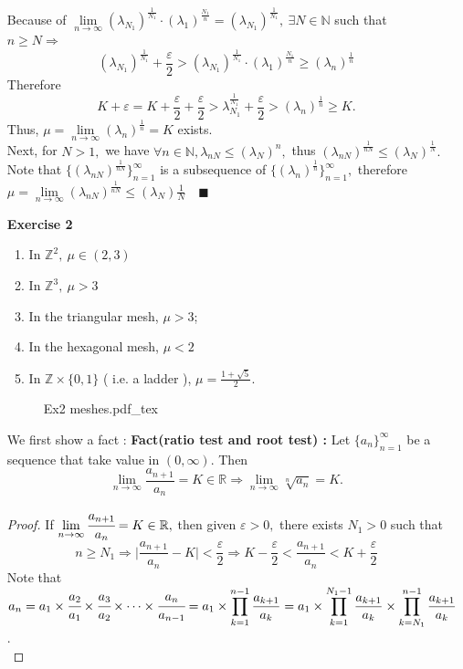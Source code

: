 \documentclass[12pt,a4paper]{article}
\newcommand{\SOL}{\fbox{ \tt s\parbox[b][2pt][c]{6pt}{o}\hspace*{-7pt} L:}}
\newcommand{\incfig}[1]{%
{#1.pdf_tex}
}
\begin{document}
\begin{enumerate}
\begin{align*}
	\end{align*}
	Because of $\lim\limits_{n\to\infty}(\lambda_{N_1})^{\frac{1}{N_1}}\cdot (\lambda_1)^{\frac{N_1}{n}}=(\lambda_{N_1})^\frac{1}{N_1},\ \exists N\in\mathbb{N}$ such that $n\geq N\Rightarrow$
	\[
	(\lambda_{N_1})^\frac{1}{N_1}+\frac{\varepsilon}{2}>(\lambda_{N_1})^\frac{1}{N_1}\cdot (\lambda_1)^{\frac{N_1}{n}}\geq (\lambda_n)^{\frac{1}{n}}
	\]
	Therefore 
	\[
	K+\varepsilon=K+\frac{\varepsilon}{2}+\frac{\varepsilon}{2}>\lambda_{N_1}^{\frac{1}{N_1}}+\frac{\varepsilon}{2}>(\lambda_n)^{\frac{1}{n}}\geq K.
	\]
	Thus, $\mu=\lim\limits_{n\to\infty}(\lambda_n)^\frac{1}{n}=K$ exists.\\
	Next, for $N>1,$ we have $\forall n\in \mathbb{N}, \lambda_{nN}\leq (\lambda_N)^n,$ thus $(\lambda_{nN})^\frac{1}{nN}\leq (\lambda_N)^\frac{1}{N}.$ Note that $\{(\lambda_{nN})^{\frac{1}{nN}}\}_{n=1}^{\infty}$ is a subsequence of $\{(\lambda_{n})^{\frac{1}{n}}\}_{n=1}^{\infty},$ therefore $\mu=\lim\limits_{n\to\infty}(\lambda_{nN})^\frac{1}{nN}\leq (\lambda_N)\frac{1}{N}\quad \blacksquare$
	\item[\textbf{Exercise 2}] \begin{enumerate}
		\item In $\mathbb{Z}^2,\ \mu\in (2,3)$
		\item In $\mathbb{Z}^3,\ \mu>3$
		\item In the triangular mesh, $\mu>3$;
		\item In the hexagonal mesh, $\mu<2$
		\item In $\mathbb{Z}\times \{0,1\}$ ( i.e. a ladder ), $\mu=\frac{1+\sqrt{5}}{2}.$
	\end{enumerate}
	\begin{figure}[htp]
	\centering
	\def\svgwidth{15cm}
	\incfig{Ex2 meshes}
	\end{figure}
	\item[\SOL] We first show a fact : 
	\newpage
	\textbf{Fact(ratio test and root test) :} Let $\{a_n\}_{n=1}^\infty$ be a sequence that take value in $(0,\infty).$ Then
	\[
	\lim_{n\to\infty}\frac{a_{n+1}}{a_n}=K\in\mathbb{R}\Rightarrow \lim_{n\to\infty}\sqrt[n]{a_n}=K.
	\]
	\begin{proof}
	If $\lim\limits_{n\to\infty}\cfrac{a_{n+1}}{a_n}=K\in\mathbb{R},$ then given $\varepsilon>0,$ there exists $N_1>0$ such that 
	\[
    	n\geq N_1\Rightarrow \Big|\frac{a_{n+1}}{a_n}-K\Big|<\frac{\varepsilon}{2}\Rightarrow K-\frac{\varepsilon}{2}<\frac{a_{n+1}}{a_n}<K+\frac{\varepsilon}{2}
	\]
	Note that $a_n=a_1\times \cfrac{a_2}{a_1}\times \cfrac{a_3}{a_2}\times \cdots \times \cfrac{a_n}{a_{n-1}}=a_1\times{\displaystyle \prod_{k=1}^{n-1} \frac{a_{k+1}}{a_k}}=a_1\times{\displaystyle \prod_{k=1}^{N_1-1} \frac{a_{k+1}}{a_k}}\times{\displaystyle \prod_{k=N_1}^{n-1} \frac{a_{k+1}}{a_k}}$ . \\

\end{proof}
\end{enumerate}
\end{document}

